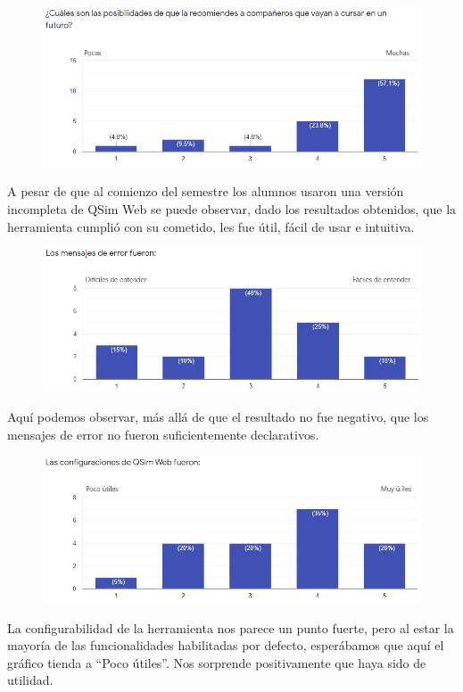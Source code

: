 \begin{figure}[H]
  \centering
  \includegraphics[width=16cm]{figuras/04_encuesta_posibilidad_recomendar.png}
\end{figure}

A pesar de que al comienzo del semestre los alumnos usaron una versión incompleta de QSim Web se puede observar, dado los resultados obtenidos, 
que la herramienta cumplió con su cometido, les fue útil, fácil de usar e intuitiva.

\begin{figure}[H]
  \centering
  \includegraphics[width=16cm]{figuras/05_encuesta_mensajes_error.png}
\end{figure}
Aquí podemos observar, más allá de que el resultado no fue negativo, que los mensajes de error no fueron suficientemente declarativos.

\begin{figure}[H]
  \centering
  \includegraphics[width=16cm]{figuras/06_encuesta_configuracion.png}
\end{figure}
La configurabilidad de la herramienta nos parece un punto fuerte, pero al estar la mayoría de las funcionalidades habilitadas por defecto, esperábamos que aquí el gráfico tienda a “Poco útiles”. Nos sorprende positivamente que haya sido de utilidad.

